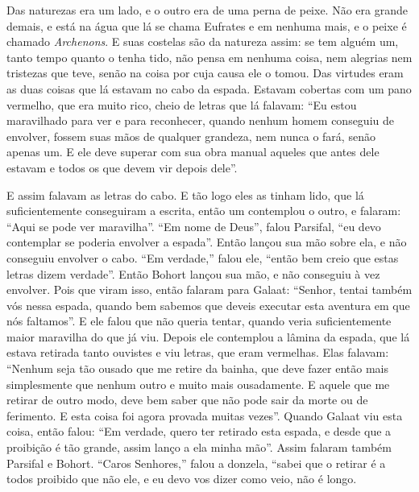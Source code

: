 Das naturezas era um lado, e o outro era de uma perna de peixe. Não era grande
demais, e está na água que lá se chama Eufrates e em nenhuma mais, e o peixe é
chamado \textit{Archenons}. E suas costelas são da natureza assim: se tem
alguém um, tanto tempo quanto o tenha tido, não pensa em nenhuma coisa, nem
alegrias nem tristezas que teve, senão na coisa por cuja causa ele o tomou. Das
virtudes eram as duas coisas que lá estavam no cabo da espada. Estavam cobertas
com um pano vermelho, que era muito rico, cheio de letras que lá falavam: “Eu
estou maravilhado para ver e para reconhecer, quando nenhum homem conseguiu de
envolver, fossem suas mãos de qualquer grandeza, nem nunca o fará, senão apenas
um. E ele deve superar com sua obra manual aqueles que antes dele estavam e
todos os que devem vir depois dele”. 

E assim falavam as letras do cabo. E tão logo eles as tinham lido, que lá
suficientemente conseguiram a escrita, então um contemplou o outro, e falaram:
“Aqui se pode ver maravilha”. “Em nome de Deus”, falou Parsifal, “eu devo
contemplar se poderia envolver a espada”. Então lançou sua mão sobre ela, e não
conseguiu envolver o cabo. “Em verdade,” falou ele, “então bem creio que estas
letras dizem verdade”. Então Bohort lançou sua mão, e não conseguiu à vez
envolver. Pois que viram isso, então falaram para Galaat: “Senhor, tentai
também vós nessa espada, quando bem sabemos que deveis executar esta aventura
em que nós faltamos”. E ele falou que não queria tentar, quando veria
suficientemente maior maravilha do que já viu. Depois ele contemplou a lâmina
da espada, que lá estava retirada tanto ouvistes e viu letras, que eram
vermelhas. Elas falavam: “Nenhum seja tão ousado que me retire da
bainha, que deve fazer então mais simplesmente que nenhum outro e muito mais
ousadamente. E aquele que me retirar de outro modo, deve bem saber que não pode
sair da morte ou de ferimento. E esta coisa foi agora provada muitas vezes”.
Quando Galaat viu esta coisa, então falou: “Em verdade, quero ter retirado esta
espada, e desde que a proibição é tão grande, assim lanço a ela minha mão”.
Assim falaram também Parsifal e Bohort. “Caros Senhores,” falou a
donzela, “sabei que o retirar é a todos proibido que não ele, e eu devo vos
dizer como veio, não é longo.

